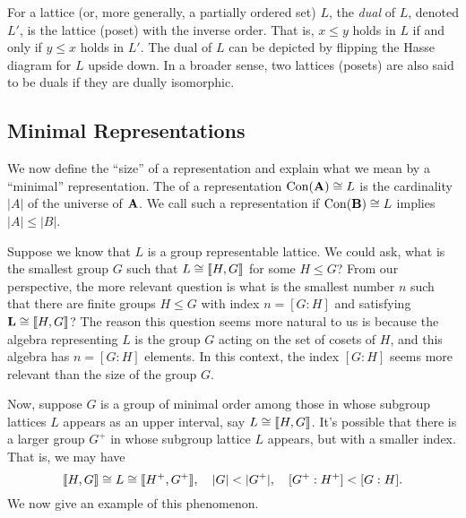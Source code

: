 For a lattice (or, more generally, a partially ordered set) 
$L$, the \emph{dual} of $L$, denoted
$L'$, is the lattice (poset) with the inverse order. That is, 
$x \leq y$ holds in $L$ if and only if $y \leq x$ holds in $L'$. 
The dual of $L$ can be depicted by flipping the Hasse diagram
for $L$ upside down. 
In a broader sense, two lattices (posets) are also said to be duals if they are
dually isomorphic.

\subsection{Minimal Representations}
\label{sec:minim-repr}
We now define the ``size'' of a representation and explain what we mean by
a ``minimal'' representation.
The  of a representation $\operatorname{Con}(\mathbf{A}) \cong L$ is the cardinality
$|A|$ of the universe of $\mathbf{A}$.  We call such a representation
 if $\operatorname{Con}(\mathbf{B}) \cong L$ implies $|A| \leq |B|$.

Suppose we know that $L$ is a group representable lattice.
We could ask, what is the smallest group $G$ such that $L \cong \llbracket H, G \rrbracket$ for
some $H\leq G$?  From our perspective, the more relevant question
is what is the smallest number $n$ such that there are finite groups $H\leq G$ with
index $n = [G:H]$ and satisfying $\mathbf{L} \cong \llbracket H, G \rrbracket$?
The reason this question seems more natural to us is because the algebra
representing $L$ is the group $G$ acting on the set of cosets of $H$, and this
algebra has $n = [G:H]$ elements.  In this context, the index $[G:H]$ seems more
relevant than the size of the group $G$.

Now, suppose $G$ is a group of minimal order among those in whose
subgroup lattices $L$ appears as an upper interval, say $L \cong \llbracket H, G\rrbracket$.
It's possible that there is a larger group $G^+$ in whose subgroup lattice $L$
appears, but with a smaller index. That is, we may have
\[\llbracket H, G \rrbracket \cong L \cong \llbracket H^+, G^+\rrbracket, \quad |G| < |G^+|,
\quad [G^+:H^+] < [G:H].\]
We now give an example of this phenomenon. 

